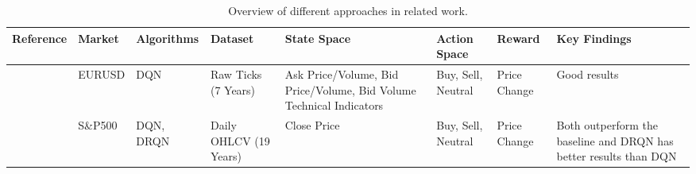 \begin{landscape}
\begin{table}[htb!]
\caption{Overview of different approaches in related work.}
\label{Tables:RelatedWork}
\centering
\footnotesize
\begin{tabularx}{\linewidth}{@{}clllXllX@{}}
\toprule
\textbf{Reference} & \textbf{Market} & \textbf{Algorithms} & \textbf{Dataset} & \textbf{State Space} & \textbf{Action Space} & \textbf{Reward} & \textbf{Key Findings} \\ 
\midrule
\cite{carapuco_reinforcement_2018} & EURUSD & DQN & Raw Ticks (7 Years) & Ask Price/Volume, Bid Price/Volume, Bid Volume Technical Indicators & Buy, Sell, Neutral & Price Change & Good results \\
\addlinespace
\cite{chen_application_2019} & S\&P500 & DQN, DRQN & Daily OHLCV (19 Years) & Close Price & Buy, Sell, Neutral & Price Change & Both outperform the baseline and DRQN has better results than DQN \\
\bottomrule
\end{tabularx}
\end{table}
\end{landscape}
